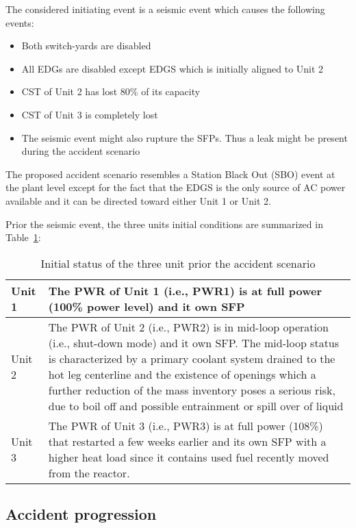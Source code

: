 The considered initiating event is a seismic event which causes the following events:
\begin{itemize}
  \item Both switch-yards are disabled
  \item All EDGs are disabled except EDGS which is initially aligned to Unit 2
  \item CST of Unit 2 has lost 80\% of its capacity 
  \item CST of Unit 3 is completely lost
  \item The seismic event might also rupture the SFPs. Thus a leak might be present during the accident scenario
\end{itemize}

The proposed accident scenario resembles a Station Black Out (SBO) event at the plant level except for the 
fact that the EDGS is the only source of AC power available and it can be directed toward either Unit 1 or Unit 2.

Prior the seismic event, the three units initial conditions are summarized in Table~\ref{tab:unitsStatus}:

\begin{table}
  \begin{tabular}{ | l | p{10cm} | }
    \hline      
      Unit 1 &  The PWR of Unit 1 (i.e., PWR1) is at full power (100\% power level) and it own SFP \\ \hline
      Unit 2 &  The PWR of Unit 2 (i.e., PWR2) is in mid-loop operation (i.e., shut-down mode) and it own SFP. 
                The mid-loop status is characterized by a primary coolant system drained to the 
                hot leg centerline and the existence of openings which a further reduction of 
                the mass inventory poses a serious risk, due to boil off and possible entrainment 
                or spill over of liquid\\ \hline
      Unit 3 &  The PWR of Unit 3 (i.e., PWR3) is at full power (108\%) that restarted a few weeks 
                earlier and its own SFP with a higher heat load since it contains used fuel recently 
                moved from the reactor. \\
    \hline  
  \end{tabular}
  \caption{Initial status of the three unit prior the accident scenario}
  \label{tab:unitsStatus}
\end{table}


\subsection{Accident progression}

